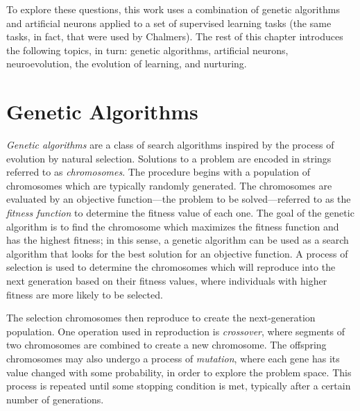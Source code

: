 \documentclass[master]{outhesis}
\begin{document}
To explore these questions, this work uses a combination of genetic algorithms and artificial neurons applied to a set of supervised learning tasks (the same tasks, in fact, that were used by Chalmers). The rest of this chapter introduces the following topics, in turn: genetic algorithms, artificial neurons, neuroevolution, the evolution of learning, and nurturing.

\section{Genetic Algorithms}






\emph{Genetic algorithms} are a class of search algorithms inspired by the process of evolution by natural selection.
Solutions to a problem are encoded in strings referred to as \emph{chromosomes}.
The procedure begins with a population of chromosomes which are typically randomly generated.
The chromosomes are evaluated by an objective function---the problem to be solved---referred to as the \emph{fitness function} to determine the fitness value of each one.
The goal of the genetic algorithm is to find the chromosome which maximizes the fitness function and has the highest fitness;
in this sense, a genetic algorithm can be used as a search algorithm that looks for the best solution for an objective function.
A process of selection is used to determine the chromosomes which will reproduce into the next generation based on their fitness values,
 where individuals with higher fitness are more likely to be selected.

The selection chromosomes then reproduce to create the next-generation population.
One operation used in reproduction is \emph{crossover}, where segments of two chromosomes are combined to create a new chromosome.
The offspring chromosomes may also undergo a process of \emph{mutation}, where each gene has its value changed with some probability, in order to explore the problem space.
This process is repeated until some stopping condition is met, typically after a certain number of generations.
\end{document}
